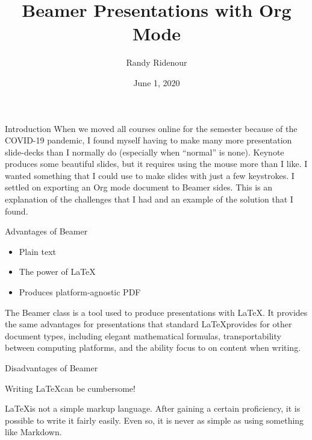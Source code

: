 \documentclass[11pt]{article}
\author{Randy Ridenour}
\date{June  1, 2020}
\title{Beamer Presentations with Org Mode}
\begin{document}
\maketitle
\maketitle

\begin{frame}[label={sec:org32a16a2},fragile]{Introduction}
 When we moved all courses online for the semester because of the COVID-19 pandemic, I found myself having to make many more presentation slide-decks than I normally do (especially when ``normal'' is none). Keynote produces some beautiful slides, but it requires using the mouse more than I like. I wanted something that I could use to make slides with just a few keystrokes. I settled on exporting an Org mode document to Beamer sides. This is an explanation of the challenges that I had and an example of the solution that I found.


\begin{block}{Advantages of Beamer}
\begin{itemize}
\item Plain text
\item The power of \LaTeX
\item Produces platform-agnostic PDF
\end{itemize}
\end{block}

The Beamer class is a tool used to produce presentations with \LaTeX. It provides the same advantages for presentations that standard \LaTeX provides for other document types, including elegant mathematical formulas, transportability between computing platforms, and the ability focus to on content when writing.


\begin{block}{Disadvantages of Beamer}
\begin{center}
\alert{Writing \LaTeX can be cumbersome!}
\end{center}
\end{block}
\LaTeX is not a simple markup language. After gaining a certain proficiency, it is possible to write it fairly easily. Even so, it is never as simple as using something like Markdown.



\end{frame}
\end{document}
